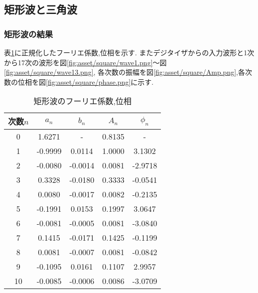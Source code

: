 \subsection{矩形波と三角波}
\subsubsection{矩形波の結果}
表\ref{tab:square_res}に正規化したフーリエ係数,位相を示す.
またデジタイザからの入力波形と1次から17次の波形を図\ref{fig:asset/square/wave1.png}〜図\ref{fig:asset/square/wave13.png},
各次数の振幅を図\ref{fig:asset/square/Amp.png},各次数の位相を図\ref{fig:asset/square/phase.png}に示す.
\begin{table}[htbp]
   \caption{矩形波のフーリエ係数,位相}
   \label{tab:square_res}
   \centering
   \begin{tabular}{ccccc}
     \hline
     次数$n$&$a_n$&$b_n$&$A_n$&$\phi_n$\\
     \hline \hline
      0 & 1.6271 & - & 0.8135 & - \\
      1 & -0.9999 & 0.0114 & 1.0000 & 3.1302 \\
      2 & -0.0080 & -0.0014 & 0.0081 & -2.9718 \\
      3 & 0.3328 & -0.0180 & 0.3333 & -0.0541 \\
      4 & 0.0080 & -0.0017 & 0.0082 & -0.2135 \\
      5 & -0.1991 & 0.0153 & 0.1997 & 3.0647 \\
      6 & -0.0081 & -0.0005 & 0.0081 & -3.0840 \\
      7 & 0.1415 & -0.0171 & 0.1425 & -0.1199 \\
      8 & 0.0081 & -0.0007 & 0.0081 & -0.0842 \\
      9 & -0.1095 & 0.0161 & 0.1107 & 2.9957 \\
      10 & -0.0085 & -0.0006 & 0.0086 & -3.0709 \\
     \hline
   \end{tabular}
\end{table}

\begin{figure}[htbp]
  \begin{minipage}{0.5\hsize}
  \end{minipage}
  \begin{minipage}{0.5\hsize}
  \end{minipage} 
\end{figure}

